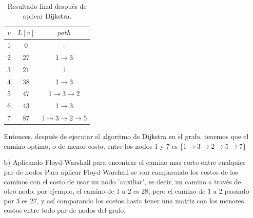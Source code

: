 \documentclass[letterpaper,10pt]{article}
\begin{document}
\begin{enumerate}
\begin{minipage}[t]{0.3\textwidth}
\begin{table}[H]
            \end{table}
        \end{minipage}
        \begin{minipage}[t]{0.3\textwidth}
            \begin{table}[H]
                \centering
            \begin{tabular}{|c|c|c|}\hline
                $ v  $ & $L[v]$ & $path$  \\ \hline
                 1 & $0$ & -      \\\hline
                 2 & $27$ & 1$\rightarrow$3   \\\hline
                 3 & $21$ & 1   \\\hline
                 4 & $38$ & 1$\rightarrow$3   \\\hline
                 5 & $47$ & 1$\rightarrow$3$\rightarrow$2   \\\hline
                 6 & $43$ & 1$\rightarrow$3   \\\hline
                 7 & $87$ & 1$\rightarrow$3$\rightarrow$2$\rightarrow$5   \\\hline
                \end{tabular}
                \caption{Resultado final después de aplicar Dijkstra.}
                \label{tablitaiteracion8}
            \end{table}
        \end{minipage}
        
        \vspace{.5cm}
        Entonces, después de ejecutar el algoritmo de Dijkstra en el grafo, tenemos que el camino optimo, o de menor costo, entre los nodos 1 y 7 es \{$1\rightarrow3\rightarrow2\rightarrow5\rightarrow7$\}

        \vspace{.5cm}
        b) Aplicando Floyd-Warshall para encontrar el camino mas corto entre cualquier par de nodos
        \newline
        \newline
        Para aplicar Floyd-Warshall se van comparando los costos de los caminos con el costo de usar un nodo 'auxiliar', es decir, un camino a través de otro nodo, por ejemplo, el camino de 1 a 2 es 28, pero el camino de 1 a 2 pasando por 3 es 27, y así comparando los costos hasta tener una matriz con los menores costos entre todo par de nodos del grafo.


\end{enumerate}
\end{document}
